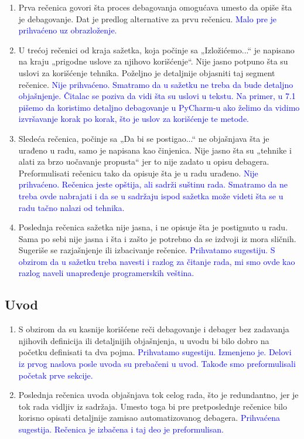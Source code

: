 \documentclass[a4paper]{report}
\newcommand{\odgovor}[1]{\textcolor{blue}{#1}}
\begin{document}
\begin{enumerate}
    \item Prva rečenica govori šta proces debagovanja omogućava umesto da opiše šta je debagovanje. Dat je predlog alternative za prvu rečenicu.
    \odgovor{Malo pre je prihvaćeno uz obrazloženje.}
    \item U trećoj rečenici od kraja sažetka, koja počinje sa „Izložićemo...“ je napisano na kraju „prigodne uslove za njihovo korišćenje“. Nije jasno potpuno šta su uslovi za korišćenje tehnika. Poželjno je detaljnije objasniti taj segment rečenice.
    \odgovor{Nije prihvaćeno. Smatramo da u sažetku ne treba da bude detaljno objašnjenje. Čitalac se poziva da vidi šta su uslovi u tekstu. Na primer, u 7.1 pišemo da koristimo detaljno debagovanje u PyCharm-u ako želimo da vidimo izvršavanje korak po korak, što je uslov za korišćenje te metode.}
    \item Sledeća rečenica, počinje sa „Da bi se postigao...“ ne objašnjava šta je urađeno u radu, samo je napisana kao činjenica. Nije jasno šta su „tehnike i alati za brzo uočavanje propusta“ jer to nije zadato u opisu debagera. Preformulisati rečenicu tako da opisuje šta je u radu urađeno.
    \odgovor{Nije prihvaćeno. Rečenica jeste opštija, ali sadrži suštinu rada. Smatramo da ne treba ovde nabrajati i da se u sadržaju ispod sažetka može videti šta se u radu tačno nalazi od tehnika.}
    \item Poslednja rečenica sažetka nije jasna, i ne opisuje šta je postignuto u radu. Sama po sebi nije jasna i šta i zašto je potrebno da se izdvoji iz mora sličnih. Sugeriše se razjašnjenje ili izbacivanje rečenice.
    \odgovor{Prihvatamo sugestiju. S obzirom da u sažetku treba navesti i razlog za čitanje rada, mi smo ovde kao razlog naveli unapređenje programerskih veština.}
\end{enumerate}

\subsection{Uvod}
\begin{enumerate}
    \item S obzirom da su kasnije korišćene reči debagovanje i debager bez zadavanja njihovih definicija ili detaljnijih objašnjenja, u uvodu bi bilo dobro na početku definisati ta dva pojma.
    \odgovor{Prihvatamo sugestiju. Izmenjeno je. Delovi iz prvog naslova posle uvoda su prebačeni u uvod. Takođe smo preformulisali početak prve sekcije.}
    \item Poslednja rečenica uvoda objašnjava tok celog rada, što je redundantno, jer je tok rada vidljiv iz sadržaja. Umesto toga bi pre pretposlednje rečenice bilo korisno opisati detaljnije zamisao automatizovanog debagera.
    \odgovor{Prihvaćena sugestija. Rečenica je izbačena i taj deo je preformulisan.}
\end{enumerate}
\end{document}
